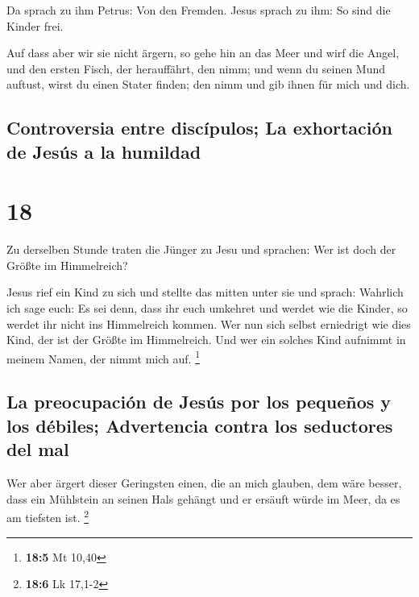 Da sprach zu ihm Petrus: Von den Fremden. Jesus sprach
zu ihm: So sind die Kinder frei.

 Auf dass aber wir sie nicht ärgern, so gehe hin an das
Meer und wirf die Angel, und den ersten Fisch, der herauffährt, den
nimm; und wenn du seinen Mund auftust, wirst du einen Stater finden; den
nimm und gib ihnen für mich und dich.

\hypertarget{controversia-entre-discuxedpulos-la-exhortaciuxf3n-de-jesuxfas-a-la-humildad}{%
\subsection{Controversia entre discípulos; La exhortación de Jesús a la
humildad}\label{controversia-entre-discuxedpulos-la-exhortaciuxf3n-de-jesuxfas-a-la-humildad}}

\hypertarget{section-17}{%
\section{18}\label{section-17}}

 Zu derselben Stunde traten die Jünger zu Jesu und
sprachen: Wer ist doch der Größte im Himmelreich?

 Jesus rief ein Kind zu sich und stellte das mitten unter
sie  und sprach: Wahrlich ich sage euch: Es sei denn, dass
ihr euch umkehret und werdet wie die Kinder, so werdet ihr nicht ins
Himmelreich kommen.  Wer nun sich selbst erniedrigt wie
dies Kind, der ist der Größte im Himmelreich.  Und wer ein
solches Kind aufnimmt in meinem Namen, der nimmt mich auf. \footnote{\textbf{18:5}
  Mt 10,40}

\hypertarget{la-preocupaciuxf3n-de-jesuxfas-por-los-pequeuxf1os-y-los-duxe9biles-advertencia-contra-los-seductores-del-mal}{%
\subsection{La preocupación de Jesús por los pequeños y los débiles;
Advertencia contra los seductores del
mal}\label{la-preocupaciuxf3n-de-jesuxfas-por-los-pequeuxf1os-y-los-duxe9biles-advertencia-contra-los-seductores-del-mal}}

 Wer aber ärgert dieser Geringsten einen, die an mich
glauben, dem wäre besser, dass ein Mühlstein an seinen Hals gehängt und
er ersäuft würde im Meer, da es am tiefsten ist. \footnote{\textbf{18:6}
  Lk 17,1-2}

